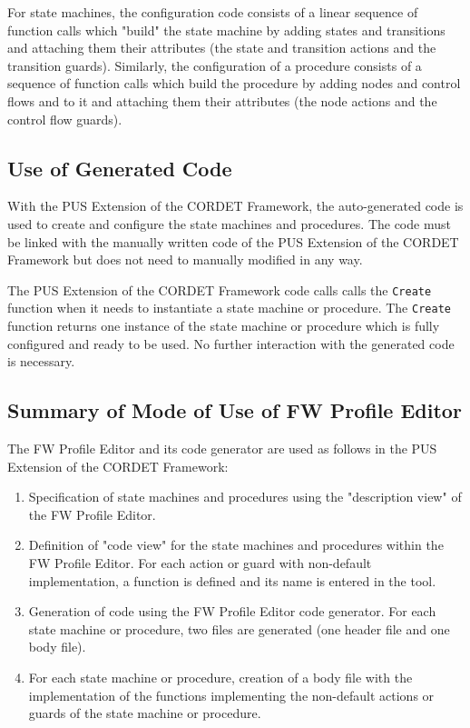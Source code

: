 \documentclass{pnp_article}
\begin{document}
For state machines, the configuration code consists of a linear sequence of function calls which "build" the state machine by adding states and transitions and attaching them their attributes (the state and transition actions and the transition guards). Similarly, the configuration of a procedure consists of a sequence of function calls which build the procedure by adding nodes and control flows and to it and attaching them their attributes (the node actions and the control flow guards). 

\subsection{Use of Generated Code}
With the PUS Extension of the CORDET Framework, the auto-generated code is used to create and configure the state machines and procedures. The code must be linked with the manually written code of the PUS Extension of the CORDET Framework but does not need to manually modified in any way.  

The PUS Extension of the CORDET Framework code calls calls the \texttt{Create} function when it needs to instantiate a state machine or procedure. The \texttt{Create} function returns one instance of the state machine or procedure which is fully configured and ready to be used. No further interaction with the generated code is necessary.

\subsection{Summary of Mode of Use of FW Profile Editor}
The FW Profile Editor and its code generator are used as follows in the PUS Extension of the CORDET Framework:

\begin{enumerate}
\item Specification of state machines and procedures using the "description view" of the FW Profile Editor. 
\item Definition of "code view" for the state machines and procedures within the FW Profile Editor. For each action or guard with non-default implementation, a function is defined and its name is entered in the tool. 
\item Generation of code using the FW Profile Editor code generator. For each state machine or procedure, two files are generated (one header file and one body file).
\item For each state machine or procedure, creation of a body file with the implementation of the functions implementing the non-default actions or guards of the state machine or procedure.
\end{enumerate}
\end{document}
